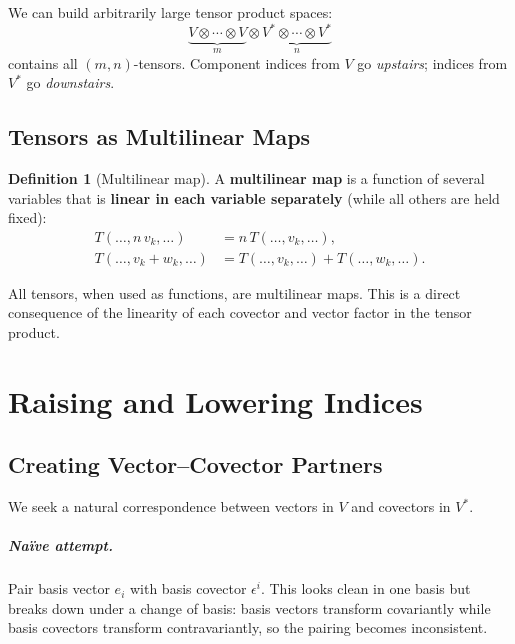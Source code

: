 \documentclass[12pt, a4paper]{report}
\theoremstyle{definition}
\newtheorem{definition}{Definition}[chapter]
\theoremstyle{plain}
\theoremstyle{remark}
\begin{document}
We can build arbitrarily large tensor product spaces:
\[
    \underbrace{V \otimes \cdots \otimes V}_{m} \otimes
    \underbrace{V^* \otimes \cdots \otimes V^*}_{n}
\]
contains all $(m,n)$-tensors.  Component indices from $V$ go \emph{upstairs};
indices from $V^*$ go \emph{downstairs}.

\section{Tensors as Multilinear Maps}

\begin{definition}[Multilinear map]
A \textbf{multilinear map} is a function of several variables that is
\textbf{linear in each variable separately} (while all others are held fixed):
\begin{align}
    T(\dots, n\,v_k, \dots) &= n\,T(\dots, v_k, \dots), \\
    T(\dots, v_k + w_k, \dots) &= T(\dots, v_k, \dots) + T(\dots, w_k, \dots).
\end{align}
\end{definition}

All tensors, when used as functions, are multilinear maps.  This is a direct
consequence of the linearity of each covector and vector factor in the tensor
product.

\chapter{Raising and Lowering Indices}\label{ch:raise-lower}

\section{Creating Vector--Covector Partners}

We seek a natural correspondence between vectors in $V$ and covectors in $V^*$.

\paragraph{Na\"ive attempt.}
Pair basis vector $e_i$ with basis covector $\epsilon^{i}$.  This looks clean in
one basis but breaks down under a change of basis: basis vectors transform
covariantly while basis covectors transform contravariantly, so the pairing becomes
inconsistent.
\end{document}
